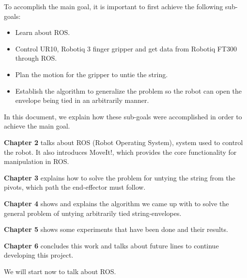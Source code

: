 To accomplish the main goal, it is important to first achieve the following sub-goals:
\begin{itemize}
\item Learn about ROS.
\item Control UR10, Robotiq 3 finger gripper and get data from Robotiq FT300 through ROS.
\item Plan the motion for the gripper to untie the string.
\item Establish the algorithm to generalize the problem so the robot can open the envelope being tied in an arbitrarily manner.
\end{itemize}

In this document, we explain how these sub-goals were accomplished in order to achieve the main goal.

\textbf{Chapter 2} talks about ROS (Robot Operating System), system used to control the robot. It also introduces MoveIt!, which provides the core functionality for manipulation in ROS.

\textbf{Chapter 3} explains how to solve the problem for untying the string from the pivots, which path the end-effector must follow.

\textbf{Chapter 4} shows and explains the algorithm we came up with to solve the general problem of untying arbitrarily tied string-envelopes. 

\textbf{Chapter 5} shows some experiments that have been done and their results.

\textbf{Chapter 6} concludes this work and talks about future lines to continue developing this project.

We will start now to talk about ROS.
